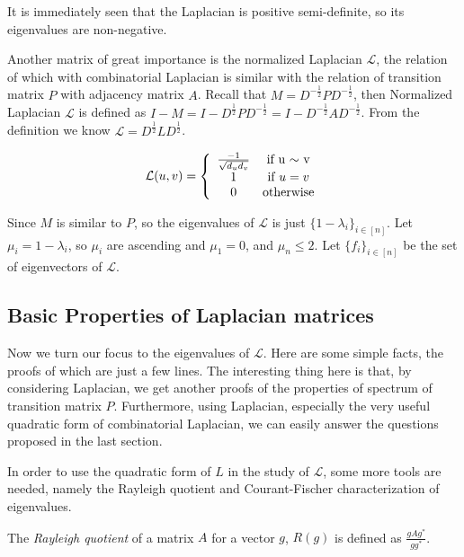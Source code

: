 It is immediately seen that the Laplacian is positive semi-definite,
so its eigenvalues are non-negative.

Another matrix of great importance is the normalized Laplacian
$\mathcal{L}$, the relation of which with combinatorial Laplacian is
similar with the relation of transition matrix $P$ with adjacency
matrix $A$. Recall that $M=D^{-\frac{1}{2}}PD^{-\frac{1}{2}}$, then
Normalized Laplacian $\mathcal{L}$ is defined as
$I-M=I-D^\frac{1}{2}PD^{-\frac{1}{2}}=I-D^{-\frac{1}{2}}AD^{-\frac{1}{2}}$.
From the definition we know $\mathcal{L}=D^\frac{1}{2} L
D^\frac{1}{2}$.

\begin{eqnarray*}
\mathcal{L}(u,v)=\left\{
\begin{array}{cc}
-1\over \sqrt{d_ud_v} & \textrm{if u $\sim$ v}\\
1 & \textrm{if $u=v$} \\
0 & \textrm{otherwise}
\end{array}
\right.
\end{eqnarray*}

Since $M$ is similar to $P$, so the eigenvalues of $\mathcal{L}$ is
just $\{1-\lambda_i\}_{i\in[n]}$. Let $\mu_i=1-\lambda_i$, so
$\mu_i$ are ascending and $\mu_1=0$, and $\mu_n\leq2$. Let
$\{f_i\}_{i\in[n]}$ be the set of eigenvectors of $\mathcal{L}$.


\subsection{Basic Properties of Laplacian matrices}

Now we turn our focus to the eigenvalues of $\mathcal{L}$. Here are
some simple facts, the proofs of which are just a few lines. The
interesting thing here is that, by considering Laplacian, we get
another proofs of the properties of spectrum of transition matrix
$P$. Furthermore, using Laplacian, especially the very useful
quadratic form of combinatorial Laplacian, we can easily answer the
questions proposed in the last section.

In order to use the quadratic form of $L$ in the study of
$\mathcal{L}$, some more tools are needed, namely the Rayleigh
quotient and Courant-Fischer characterization of eigenvalues.

\begin{definition}
The \emph{Rayleigh quotient} of a matrix $A$ for a vector $g$,
$R(g)$ is defined as $\frac{gAg^*}{gg^*}$.
\end{definition}

